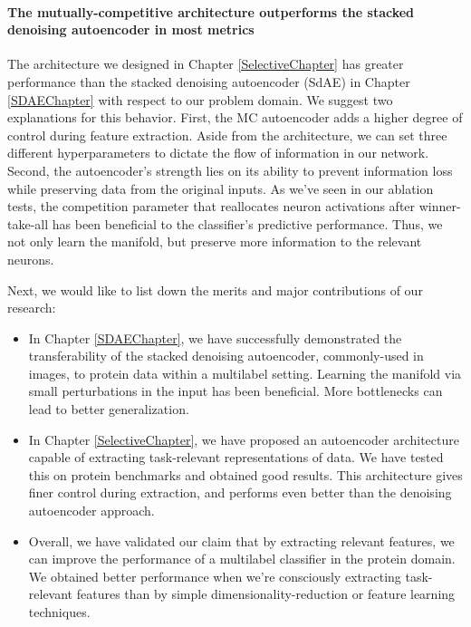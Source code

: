 \paragraph{The mutually-competitive architecture outperforms the stacked
denoising autoencoder in most metrics} The architecture we designed in Chapter
\ref{SelectiveChapter} has greater performance than the stacked denoising
autoencoder (SdAE) in Chapter \ref{SDAEChapter} with respect to our problem
domain. We suggest two explanations for this behavior. First, the MC
autoencoder adds a higher degree of control during feature extraction. Aside
from the architecture, we can set three different hyperparameters to dictate the
flow of information in our network. Second, the autoencoder's strength lies on
its ability to prevent information loss while preserving data from the original
inputs. As we've seen in our ablation tests, the competition parameter that
reallocates neuron activations after winner-take-all has been beneficial to the
classifier's predictive performance. Thus, we not only learn the manifold, but
preserve more information to the relevant neurons.

\newpage
\par Next, we would like to list down the merits and major contributions of our
research:
\begin{itemize}
    \item In Chapter \ref{SDAEChapter}, we have successfully demonstrated the
        transferability of the stacked denoising autoencoder, commonly-used in
        images, to protein data within a multilabel setting. Learning the
        manifold via small perturbations in the input has been beneficial. More
        bottlenecks can lead to better generalization.
    \item In Chapter \ref{SelectiveChapter}, we have proposed an autoencoder
        architecture capable of extracting task-relevant representations of
        data. We have tested this on protein benchmarks and obtained good
        results. This architecture gives finer control during extraction, and
        performs even better than the denoising autoencoder approach.
    \item Overall, we have validated our claim that by extracting relevant
        features, we can improve the performance of a multilabel classifier in
        the protein domain. We obtained better performance when we're
        consciously extracting task-relevant features than by simple
        dimensionality-reduction or feature learning techniques.
\end{itemize}

